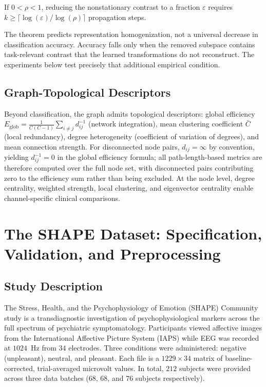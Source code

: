 \begin{corollary}
If $0<\rho<1$, reducing the nonstationary contrast to a fraction $\varepsilon$
requires
$k\ge \lceil\log(\varepsilon)/\log(\rho)\rceil$ propagation steps.
\end{corollary}

The theorem predicts representation homogenization, not a universal decrease in
classification accuracy. Accuracy falls only when the removed subspace contains
task-relevant contrast that the learned transformations do not reconstruct. The
experiments below test precisely that additional empirical condition.

\subsection{Graph-Topological Descriptors}

Beyond classification, the graph admits topological descriptors: global efficiency $E_{\text{glob}} = \frac{1}{C(C-1)} \sum_{i \neq j} d_{ij}^{-1}$ (network integration), mean clustering coefficient $\bar{C}$ (local redundancy), degree heterogeneity (coefficient of variation of degrees), and mean connection strength. For disconnected node pairs, $d_{ij} = \infty$ by convention, yielding $d_{ij}^{-1} = 0$ in the global efficiency formula; all path-length-based metrics are therefore computed over the full node set, with disconnected pairs contributing zero to the efficiency sum rather than being excluded. At the node level, degree centrality, weighted strength, local clustering, and eigenvector centrality enable channel-specific clinical comparisons.


\section{The SHAPE Dataset: Specification, Validation, and Preprocessing}
\label{sec:ch5_dataset}

\subsection{Study Description}

The Stress, Health, and the Psychophysiology of Emotion (SHAPE) Community study \cite{noauthor_shape_2018} is a transdiagnostic investigation of psychophysiological markers across the full spectrum of psychiatric symptomatology. Participants viewed affective images from the International Affective Picture System (IAPS) \cite{lang_iaps_2008} while EEG was recorded at $1024$~Hz from $34$ electrodes. Three conditions were administered: negative (unpleasant), neutral, and pleasant. Each file is a $1229 \times 34$ matrix of baseline-corrected, trial-averaged microvolt values. In total, $212$ subjects were provided across three data batches ($68$, $68$, and $76$ subjects respectively).

